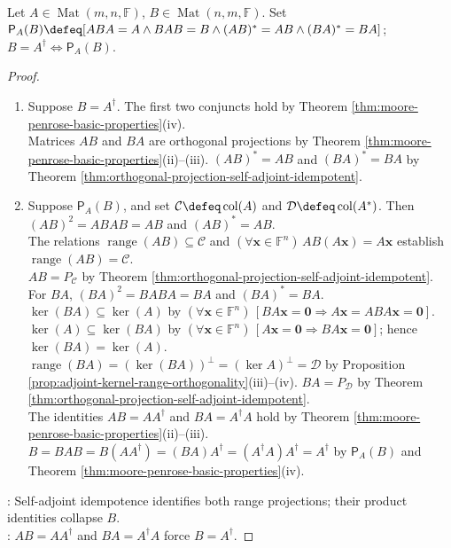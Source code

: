 \begin{theorem} \label{thm:penrose-equations-characterize-pseudoinverse} \\
Let $A\in\operatorname{Mat}(m,n,\mathbb{F})$, $B\in\operatorname{Mat}(n,m,\mathbb{F})$. Set $\mathsf{P}_A(B)\defeq[ABA=A\land BAB=B\land(AB)^*=AB\land(BA)^*=BA]$; $B=A^{\dagger}\Longleftrightarrow\mathsf{P}_A(B)$.
\begin{proof}
\begin{enumerate}[label=\roman*.]
\setlength{\itemsep}{0pt}
\item[$(\Rightarrow)$] Suppose $B=A^{\dagger}$. The first two conjuncts hold by Theorem \ref{thm:moore-penrose-basic-properties}(iv).\\
Matrices $AB$ and $BA$ are orthogonal projections by Theorem \ref{thm:moore-penrose-basic-properties}(ii)--(iii). $(AB)^*=AB$ and $(BA)^*=BA$ by Theorem \ref{thm:orthogonal-projection-self-adjoint-idempotent}.
\item[$(\Leftarrow)$] Suppose $\mathsf{P}_A(B)$, and set $\mathcal{C}\defeq\operatorname{col}(A)$ and $\mathcal{D}\defeq\operatorname{col}(A^*)$. Then $(AB)^2=ABAB=AB$ and $(AB)^*=AB$.\\
The relations $\operatorname{range}(AB)\subseteq\mathcal{C}$ and $(\forall\mathbf{x}\in\mathbb{F}^n)\,AB(A\mathbf{x})=A\mathbf{x}$ establish $\operatorname{range}(AB)=\mathcal{C}$.\\
$AB=P_{\mathcal{C}}$ by Theorem \ref{thm:orthogonal-projection-self-adjoint-idempotent}. For $BA$, $(BA)^2=BABA=BA$ and $(BA)^*=BA$.\\
$\ker(BA)\subseteq\ker(A)$ by $(\forall\mathbf{x}\in\mathbb{F}^n)\,[BA\mathbf{x}=\mathbf{0}\Rightarrow A\mathbf{x}=ABA\mathbf{x}=\mathbf{0}]$.\\
$\ker(A)\subseteq\ker(BA)$ by $(\forall\mathbf{x}\in\mathbb{F}^n)\,[A\mathbf{x}=\mathbf{0}\Rightarrow BA\mathbf{x}=\mathbf{0}]$; hence $\ker(BA)=\ker(A)$.\\
$\operatorname{range}(BA)=(\ker(BA))^{\perp}=(\ker A)^{\perp}=\mathcal{D}$ by Proposition \ref{prop:adjoint-kernel-range-orthogonality}(iii)--(iv). $BA=P_{\mathcal{D}}$ by Theorem \ref{thm:orthogonal-projection-self-adjoint-idempotent}.\\
The identities $AB=AA^{\dagger}$ and $BA=A^{\dagger}A$ hold by Theorem \ref{thm:moore-penrose-basic-properties}(ii)--(iii).\\
$B=BAB=B(AA^{\dagger})=(BA)A^{\dagger}=(A^{\dagger}A)A^{\dagger}=A^{\dagger}$ by $\mathsf{P}_A(B)$ and Theorem \ref{thm:moore-penrose-basic-properties}(iv).
\end{enumerate}
: Self-adjoint idempotence identifies both range projections; their product identities collapse $B$.\\
: $AB=AA^{\dagger}$ and $BA=A^{\dagger}A$ force $B=A^{\dagger}$.
\end{proof}
\end{theorem}

